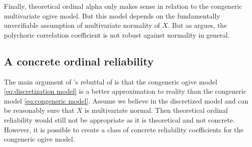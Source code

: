 \documentclass[twoside]{article}
\begin{document}
Finally, theoretical ordinal alpha only makes sense in relation to
the congeneric multivariate ogive model. But this model depends on
the fundamentally unverifiable assumption of multivariate normality
of $X$. But as \citet{Foldnes2019-yd} argues, the polychoric correlation coefficient is not robust against normality in general.

\subsection{A concrete ordinal reliability}

The main argument of \citet{Zumbo2019-lm}'s rebuttal of \citep{Chalmers2018-fj}
is that the congeneric ogive model \eqref{eq:discretization model} 
is a better approximation to reality than the congeneric model \eqref{eq:congeneric model}.
Assume we believe in the discretized model and can be reasonably
sure that $X$ is multivariate normal. Then theoretical ordinal reliability would still
not be appropriate as it is theoretical and not concrete. However,
it is possible to create a class of concrete reliability coefficients for the
congeneric ogive model.
\end{document}
